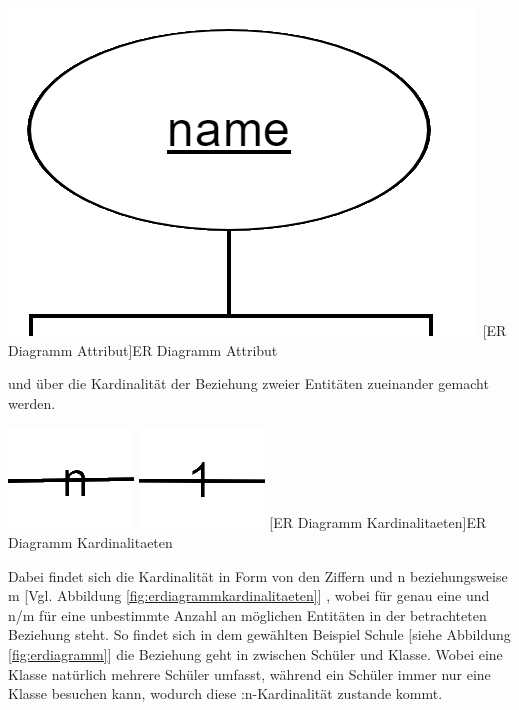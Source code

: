 \documentclass[12pt,a4paper,bibliography=totocnumbered,listof=totocnumbered]{scrartcl}
\begin{document}
\vspace{1em}
\begin{minipage}{\linewidth}
	\centering
	\includegraphics[width=0.6\linewidth]{Bilder/erd-attribut.png}
	[ER Diagramm Attribut]{ER Diagramm Attribut}
	\label{fig:erdiagrammattribut}
\end{minipage}
 

und über die Kardinalität der Beziehung zweier Entitäten zueinander gemacht werden.

\vspace{1em}
\begin{minipage}{\linewidth}
	\centering
	\includegraphics[width=0.2\linewidth]{Bilder/erd-kardinalitaet1.png}
	\includegraphics[width=0.2\linewidth]{Bilder/erd-kardinalitaet2.png}
	[ER Diagramm Kardinalitaeten]{ER Diagramm Kardinalitaeten}
	\label{fig:erdiagrammkardinalitaeten}
\end{minipage}


Dabei findet sich die Kardinalität in Form von den Ziffern \grqq{} und \glqq n\grqq{} beziehungsweise \glqq m\grqq{} [Vgl. Abbildung \ref{fig:erdiagrammkardinalitaeten}]
, wobei \grqq{} für genau eine und \glqq n\grqq{}/\glqq m\grqq{} für eine unbestimmte Anzahl an möglichen Entitäten in der betrachteten Beziehung steht.
So findet sich in dem gewählten Beispiel Schule [siehe Abbildung \ref{fig:erdiagramm}]
die Beziehung \glqq geht in\grqq{} zwischen Schüler und Klasse. Wobei eine Klasse natürlich mehrere Schüler umfasst, während ein Schüler immer nur eine Klasse besuchen kann, wodurch diese :n-Kardinalität\grqq{} zustande kommt.
\end{document}
